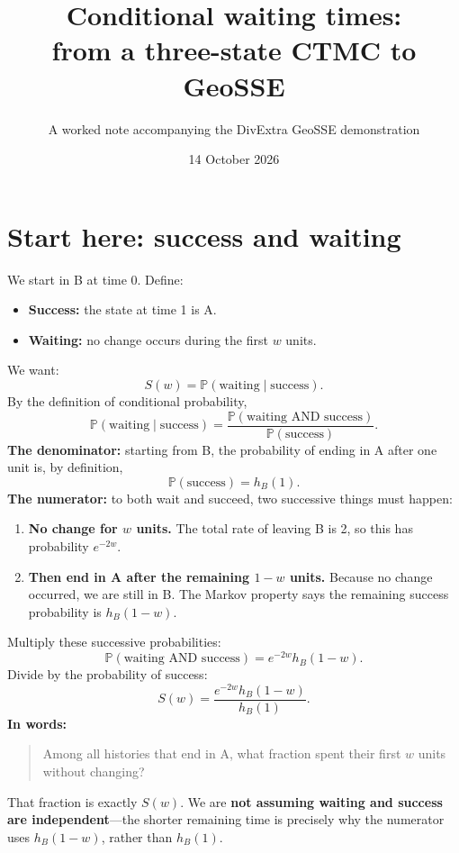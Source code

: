 \documentclass[11pt,a4paper]{article}
\title{Conditional waiting times:\\from a three-state CTMC to GeoSSE}
\author{A worked note accompanying the DivExtra GeoSSE demonstration}
\date{14 October 2026}
\newcommand{\Prob}{\mathbb{P}}
\begin{document}
\maketitle

\section{Start here: success and waiting}
We start in B at time 0. Define:
\begin{itemize}
\item \textbf{Success:} the state at time 1 is A.
\item \textbf{Waiting:} no change occurs during the first \(w\) units.
\end{itemize}
We want:
\[
S(w)=\Prob(\text{waiting}\mid\text{success}).
\]
By the definition of conditional probability,
\[
\Prob(\text{waiting}\mid\text{success})
=\frac{\Prob(\text{waiting AND success})}{\Prob(\text{success})}.
\]
\textbf{The denominator:} starting from B, the probability of ending in A
after one unit is, by definition,
\[
\Prob(\text{success})=h_B(1).
\]
\textbf{The numerator:} to both wait and succeed, two successive things must happen:
\begin{enumerate}
\item \textbf{No change for \(w\) units.} The total rate of leaving B is 2,
so this has probability \(e^{-2w}\).
\item \textbf{Then end in A after the remaining \(1-w\) units.}
Because no change occurred, we are still in B. The Markov property says the
remaining success probability is \(h_B(1-w)\).
\end{enumerate}
Multiply these successive probabilities:
\[
\Prob(\text{waiting AND success})=e^{-2w}h_B(1-w).
\]
Divide by the probability of success:
\begin{equation}
\boxed{S(w)=\frac{e^{-2w}h_B(1-w)}{h_B(1)}}.
\label{eq:key}
\end{equation}
\textbf{In words:}
\begin{quote}
Among all histories that end in A, what fraction spent their first \(w\)
units without changing?
\end{quote}
That fraction is exactly \(S(w)\). We are \textbf{not assuming waiting and
success are independent}---the shorter remaining time is precisely why the
numerator uses \(h_B(1-w)\), rather than \(h_B(1)\).

\newpage
\end{document}

